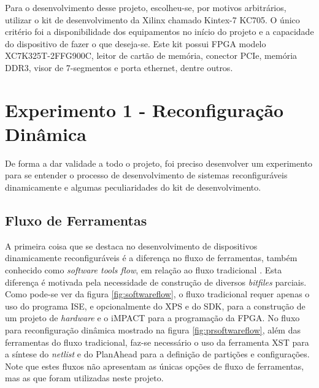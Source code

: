 \documentclass[11pt,a4paper,oneside]{book}
\begin{document}
Para o desenvolvimento desse projeto, escolheu-se, por motivos arbitrários, utilizar o kit de desenvolvimento da Xilinx\textregistered{} chamado Kintex-7 KC705.
O único critério foi a disponibilidade dos equipamentos no início do projeto e a capacidade do dispositivo de fazer o que deseja-se.
Este kit possui FPGA modelo XC7K325T-2FFG900C, leitor de cartão de memória, conector PCIe\textregistered{}, memória DDR3, visor de 7-segmentos e porta ethernet, dentre outros.

\section{Experimento 1 - Reconfiguração Dinâmica}
De forma a dar validade a todo o projeto, foi preciso desenvolver um experimento para se entender o processo de desenvolvimento de sistemas reconfiguráveis dinamicamente e algumas peculiaridades do kit de desenvolvimento.

\subsection{Fluxo de Ferramentas}
A primeira coisa que se destaca no desenvolvimento de dispositivos dinamicamente reconfiguráveis é a diferença no fluxo de ferramentas, também conhecido como \textit{software tools flow}, em relação ao fluxo tradicional \cite{ug743}.
Esta diferença é motivada pela necessidade de construção de diversos \textit{bitfiles} parciais.
Como pode-se ver da figura \ref{fig:softwareflow}, o fluxo tradicional requer apenas o uso do programa ISE, e opcionalmente do XPS e do SDK, para a construção de um projeto de \textit{hardware} e o iMPACT para a programação da FPGA.
No fluxo para reconfiguração dinâmica mostrado na figura \ref{fig:prsoftwareflow}, além das ferramentas do fluxo tradicional, faz-se necessário o uso da ferramenta XST para a síntese do \textit{netlist} e do PlanAhead para a definição de partições e configurações.
Note que estes fluxos não apresentam as únicas opções de fluxo de ferramentas, mas as que foram utilizadas neste projeto.
\end{document}
